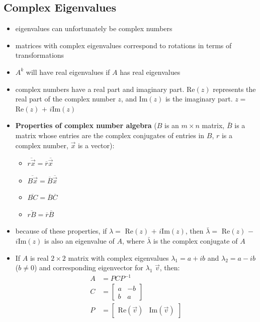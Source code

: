 \documentclass[a4paper,12pt]{article}
\theoremstyle{definition}
\theoremstyle{definition}
\begin{document}
	\subsection{Complex Eigenvalues}
	\begin{itemize}
		\item eigenvalues can unfortunately be complex numbers
		
		\item matrices with complex eigenvalues correspond to rotations in terms of transformations
		
		\item $A^k$ will have real eigenvalues if $A$ has real eigenvalues
		
		\item complex numbers have a real part and imaginary part. Re$(z)$ represents the real part of the complex number $z$, and Im$(z)$ is the imaginary part. $z =$ Re$(z)$ $+$ $i$Im$(z)$
		
		\item \textbf{Properties of complex number algebra} ($B$ is an $m \times n$ matrix, $\bar{B}$ is a matrix whose entries are the complex conjugates of entries in $B$, $r$ is a complex number, $\vec{x}$ is a vector):
		
		\begin{itemize}
			\item $\overline{r\vec{x}} = \overline{r}\overline{\vec{x}}$
			
			\item $\overline{B\vec{x}} = \overline{B}\overline{\vec{x}}$
			
			\item $\overline{BC} = \overline{B}\overline{C}$
			
			\item $\overline{rB} = \overline{r}\overline{B}$
		\end{itemize}
		
		\item because of these properties, if $\lambda =$ Re$(z)$ $+$ $i$Im$(z)$, then $\bar{\lambda} =$ Re$(z)$ $-$ $i$Im$(z)$ is also an eigenvalue of $A$, where $\bar{\lambda}$ is the complex conjugate of $A$
		
		\item If $A$ is real $2 \times 2$ matrix with complex eigenvalues $\lambda_1 = a + ib$ and $\lambda_2 = a - ib$ ($b \neq 0$) and corresponding eigenvector for $\lambda_1$ $\vec{v}$, then:
		\begin{align*}
			A &= PCP^{-1}\\
			C &=
			\begin{bmatrix}
				a & -b\\
				b & a
			\end{bmatrix}\\
			P &=
			\begin{bmatrix}
				\text{Re}(\vec{v}) & \text{Im}(\vec{v})
			\end{bmatrix}
		\end{align*}
	\end{itemize}
	
\end{document}
